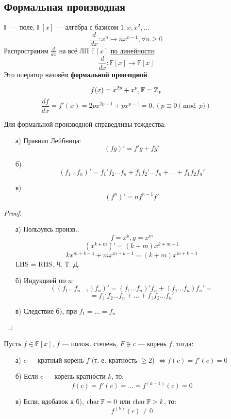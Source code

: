 \subsection{Формальная производная}
$\mathbb{F}$ --- поле, $\mathbb{F}[x]$ --- алгебра с базисом $1, x, x^{2}, \ldots$
\[
\frac{d}{dx} \colon x^{n} \mapsto n x^{n - 1}, \forall n \geq 0
\]
Распространим $\frac{d}{dx}$ на всё ЛП $\mathbb{F}[x]$ \underline{по линейности}:
\[
 \frac{d}{dx} \colon \mathbb{F}[x]  \rightarrow \mathbb{F}[x]
\]
Это оператор назовём \textbf{формальной произодной}.
\begin{example}
  \[
  f(x) = x^{2p} + x^{p}, \mathbb{F} = \mathbb{Z}_p
  \]
  \[
  \frac{df}{dx} = f'(x) = 2p x^{2p - 1} + px^{p - 1} = 0, (p \equiv 0 \pmod p)
  \]
\end{example}
\begin{statement}
  \label{statement:02_ddx_01}
  Для формальной производной справедливы тождества:
  \begin{itemize}
    \item [а) ] Правило Лейбница:
      \[
      (fg)' = f'g + fg'
    \]
  \item [б) ] \[
    (f_1 \ldots f_n)' = f_1'f_2\ldots f_n + f_1 f_2' \ldots f_n + \ldots + f_1 f_2 f_n'
  \]
\item [в) ] \[
    (f^{n})' = n f^{n - 1} f'
\]
  \end{itemize}
\end{statement}
\begin{proof}
  \begin{itemize}
    \item [а) ] Пользуясь произв.:
      \[
      f = x^{k}, g = x^{m}
      \]
      \[
        (x^{k + m})' = (k + m)x^{k +m - 1}
      \]
      \[
      kx^{m + k - 1} + m x^{m + k - 1} = (k + m) x^{m + k - 1}
      \]
      LHS = RHS, Ч. Т. Д.
    \item [б) ] Индукцией по $n$:
      \[
        ((f_1\ldots f_{n - 1}) f_n)' = (f_1 \ldots f_n)' f_n + (f_1 \ldots f_n) f_n' = 
      \]
      \[
      = f_1'f_2\ldots f_n + \ldots + f_1 f_2 \ldots f_n'
      \]
    \item [в) ] Следствие б), при $f_1 = \ldots = f_n$
  \end{itemize}
\end{proof}
\begin{theorem}
\label{theorem:02_4}
  Пусть $f \in \mathbb{F}[x]$, $f$ --- полож. степень, $F \ni c$ --- корень $f$, тогда:
  \begin{itemize}
    \item [а) ] $c$ --- кратный корень $f$ (т. е. кратность $\geq 2$) $\iff f(c) = f'(c) = 0$
    \item [б) ] Если $c$ --- корень кратности $k$, то:
      \[
      f(c) = f'(c) = \ldots = f^{(k - 1)}(c) = 0
      \]
    \item [в) ] Если, вдобавок к б), $\operatorname{char} \mathbb{F} = 0$ или $\operatorname{char} \mathbb{F} > k$, то:
      \[
        f^{(k)}(c) \neq 0
      \]
  \end{itemize}
\end{theorem}

